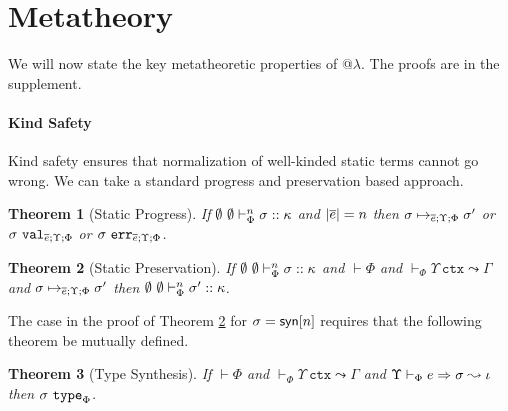 \documentclass[pldi]{sigplanconf-pldi15}
\newtheorem{theorem}{Theorem}
\newtheorem{lemma}{Lemma}
\begin{document}


\section{Metatheory}\label{metatheory}
\noindent We will now state the key metatheoretic properties of @$\lambda$. The proofs are in the supplement. 

\paragraph{Kind Safety} Kind safety ensures that normalization of well-kinded static terms cannot go wrong. We can take a standard progress and preservation based approach. 
\begin{theorem}[Static Progress]\label{thm:static-progress}
If $\emptyset~\emptyset \vdash_{\Phi}^{n} \sigma :: \kappa$ and $|\overline{e}|=n$ then $\sigma \mapsto_{\overline{e}; \Upsilon; \Phi} \sigma'$ or $\sigma~\mathtt{val}_{\overline{e}; \Upsilon; \Phi}$ or $\sigma~\mathtt{err}_{\overline{e}; \Upsilon; \Phi}$.
\end{theorem}

\begin{theorem}[Static Preservation]\label{thm:static-preservation}
If $\emptyset~\emptyset \vdash_{\Phi}^{n} \sigma :: \kappa$ and $\vdash \Phi$ and $\vdash_\Phi \Upsilon~\mathtt{ctx} \leadsto \Gamma$ and $\sigma \mapsto_{\overline{e}; \Upsilon; \Phi} \sigma'$ then $\emptyset~\emptyset \vdash_{\Phi}^{n} \sigma' :: \kappa$.
\end{theorem}\noindent
The case in the proof of Theorem \ref{thm:static-preservation} for $\sigma={\sf syn}[n]$ requires that the following theorem be mutually defined. %
\begin{theorem}[Type Synthesis]
If $\vdash \Phi$ and $\vdash_\Phi \Upsilon~\mathtt{ctx} \leadsto \Gamma$ and $\Upsilon \vdash_{\Phi} e \Rightarrow \sigma \leadsto \iota$ then $\sigma~\mathtt{type}_\Phi$. 
\end{theorem}
\end{document}
